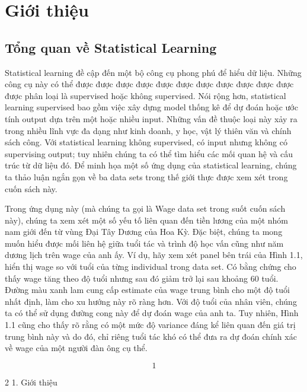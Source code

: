 \section{Giới thiệu}

\subsection{Tổng quan về Statistical Learning}

Statistical learning đề cập đến một bộ công cụ phong phú để hiểu dữ liệu. Những công cụ này có thể được được được được được được được được được được được được phân loại là supervised hoặc không supervised. Nói rộng hơn, statistical learning supervised bao gồm việc xây dựng model thống kê để dự đoán hoặc ước tính output dựa trên một hoặc nhiều input. Những vấn đề thuộc loại này xảy ra trong nhiều lĩnh vực đa dạng như kinh doanh, y học, vật lý thiên văn và chính sách công. Với statistical learning không supervised, có input nhưng không có supervising output; tuy nhiên chúng ta có thể tìm hiểu các mối quan hệ và cấu trúc từ dữ liệu đó. Để minh họa một số ứng dụng của statistical learning, chúng ta thảo luận ngắn gọn về ba data sets trong thế giới thực được xem xét trong cuốn sách này.

Trong ứng dụng này (mà chúng ta gọi là Wage data set trong suốt cuốn sách này), chúng ta xem xét một số yếu tố liên quan đến tiền lương của một nhóm nam giới đến từ vùng Đại Tây Dương của Hoa Kỳ. Đặc biệt, chúng ta mong muốn hiểu được mối liên hệ giữa tuổi tác và trình độ học vấn cũng như năm dương lịch trên wage của anh ấy. Ví dụ, hãy xem xét panel bên trái của Hình 1.1, hiển thị wage so với tuổi của từng individual trong data set. Có bằng chứng cho thấy wage tăng theo độ tuổi nhưng sau đó giảm trở lại sau khoảng 60 tuổi. Đường màu xanh lam cung cấp estimate của wage trung bình cho một độ tuổi nhất định, làm cho xu hướng này rõ ràng hơn. Với độ tuổi của nhân viên, chúng ta có thể sử dụng đường cong này để dự đoán wage của anh ta. Tuy nhiên, Hình 1.1 cũng cho thấy rõ rằng có một mức độ variance đáng kể liên quan đến giá trị trung bình này và do đó, chỉ riêng tuổi tác khó có thể đưa ra dự đoán chính xác về wage của một người đàn ông cụ thể.

\[1\]

2 1. Giới thiệu

